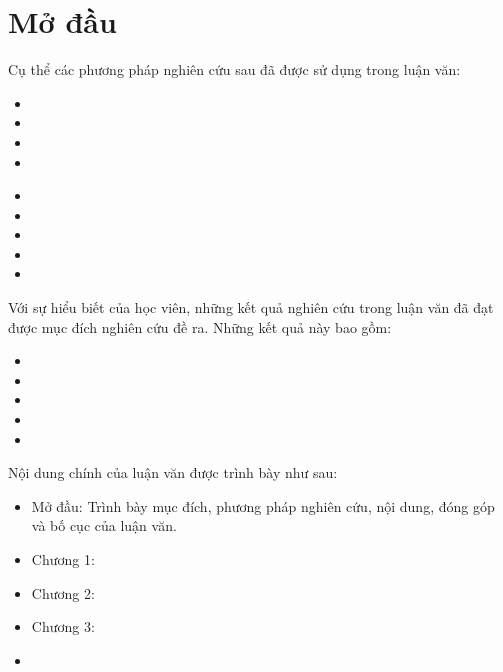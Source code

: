 \clearpage
{}

\chapter*{Mở đầu}


\vspace{0.5cm}


Cụ thể các phương pháp nghiên cứu sau đã được sử dụng trong luận văn:

\renewcommand{\labelitemi}{$-$}
\begin{itemize}
	\item 
	\item 
	\item 
	\item 
\end{itemize} 
\vspace{0.3cm}


\renewcommand{\labelitemi}{$-$}
\begin{itemize}
	\item 
	\item 
	\item 
	\item 
	\item 
\end{itemize} 
\vspace{0.3cm}


Với sự hiểu biết của học viên, những kết quả nghiên cứu trong luận văn đã đạt được mục đích nghiên cứu đề ra. Những kết quả này bao gồm:

\renewcommand{\labelitemi}{$-$}
\begin{itemize}
	\item 
	\item 
	\item 
	\item
	\item 
\end{itemize} 

\vspace{0.5cm}

Nội dung chính của luận văn được trình bày như sau:

\renewcommand{\labelitemi}{$-$}
\begin{itemize}
	\item Mở đầu: Trình bày mục đích, phương pháp nghiên cứu, nội dung, đóng góp và bố cục của luận văn.
	\item Chương 1: 
	\item Chương 2: 
	\item Chương 3: 
	\item 
\end{itemize} 